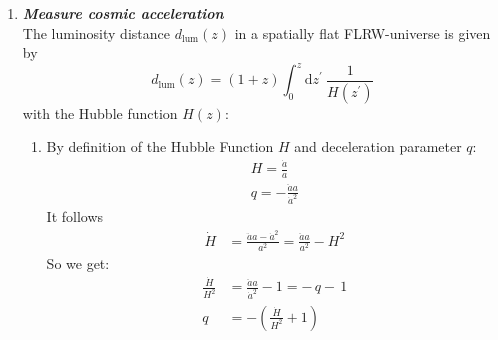 \documentclass[a4paper,12pt]{article}
\newcommand{\question}[1]{\textbf{\textit{#1}}}
\begin{document}
\begin{enumerate}
		
		
		\item \question{Measure cosmic acceleration}\\
		The luminosity distance $d_\mathrm{lum}(z)$ in a spatially flat FLRW-universe is given by
		\begin{equation}
		d_\mathrm{lum}(z) = (1+z)\int_0^z\mathrm{d}z^\prime\:\frac{1}{H(z^\prime)}
		\end{equation}
		with the Hubble function $H(z)$:
		\begin{enumerate}
			\item
					By definition of the Hubble Function $H$ and deceleration parameter $q$:
					\begin{align*}
						H=\frac{\dot{a}}{a} \\
						q=-\frac{\ddot{a}a}{\dot{a}^2}
					\end{align*}
		It follows
		\begin{align*}
		\dot{H}&=\frac{\ddot{a}a-\dot{a}^2}{a^2}=\frac{\ddot{a}a}{a^2}-H^2		
		\end{align*}
		So we get:
		\begin{align*}
		\frac{\dot{H}}{H^2}&=\frac{\ddot{a}a}{\dot{a}^2}-1=-\,q -\, 1\\
		q&=-\left(\frac{\dot{H}}{H^2}+1\right)	
		\end{align*}
	

\end{enumerate}
\end{enumerate}
\end{document}
